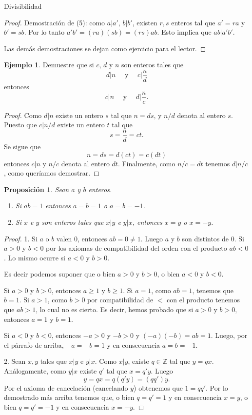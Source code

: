\documentclass[11pt,spanish,makeidx]{amsbook}
\newtheorem{proposicion}[teorema]{Proposici\'on}
\theoremstyle{definition}
\newtheorem{ejemplo}{Ejemplo}[section]
\theoremstyle{remark}
\begin{document}
\begin{section}{Divisibilidad}
\begin{proof}
	Demostración de (5): como $a|a'$, $b|b'$, existen $r,s$ enteros tal que $a'=ra$ y $b' =sb$. Por lo tanto $a'b' = (ra)(sb) = (rs)ab$. Esto implica que  $ab|a'b'$.

	Las demás demostraciones se dejan como ejercicio para el lector. 

\end{proof}

\begin{ejemplo} Demuestre que si $c$, $d$ y $n$ son enteros tales
que
$$
d|n \quad\text{ y }\quad c|\frac{n}{d}
$$
entonces
$$
c|n \quad\text{ y }\quad d|\frac{n}{c}.
$$
\end{ejemplo}
\begin{proof} Como $d|n$ existe un entero $s$ tal que $n=ds$, y $n/d$ denota al entero $s$. Puesto que $c|n/d$ existe un entero $t$ tal que
$$
s=\frac{n}{d} =ct.
$$
Se sigue que
$$
n=ds=d(ct)=c(dt)
$$
entonces $c|n$ y $n/c$ denota al entero $dt$. Finalmente, como $n/c=dt$ tenemos $d|n/c$, como queríamos demostrar.
\end{proof}

\begin{proposicion}\label{pm} Sean $a$ y $b$ enteros.
\begin{enumerate}
\item Si  $ab=1$ entonces $a=b=1$ o $a=b=-1$. 
\item Si $x$ e $y$ son enteros tales que $x|y$ e $y|x$, entonces $x=y$ o $x=-y$.
\end{enumerate}
\end{proposicion}
\begin{proof} 1. Si $a$ o $b$ valen 0, entonces $ab=0 \not=1$. Luego $a$ y $b$ son distintos de 0. Si $a>0$ y $b<0$ por los axiomas de compatibilidad del orden con el producto $ab<0$. Lo mismo ocurre si $a<0$ y $b>0$.

Es decir podemos suponer que o bien $a>0$ y $b>0$, o bien $a<0$ y $b<0$. 

Si  $a>0$ y $b>0$, entonces  $a\ge 1$ y $b\ge 1$. Si $a=1$, como $ab =1$, tenemos que $b = 1$. Si $a>1$, como  $b>0$ por compatibilidad de $<$ con el producto tenemos que $ab>1$, lo cual no es cierto. Es decir, hemos probado que si  $a>0$ y $b>0$, entonces $a=1$ y $b=1$.

Si  $a<0$ y $b<0$, entonces   $-a>0$ y $-b>0$ y $(-a)(-b) = ab =1$. Luego, por el párrafo de arriba, $-a=-b=1$ y en consecuencia $a=b=-1$.

\vskip 0.1cm

2. Sean $x,y$ tales que  $x|y$ e $y|x$. Como $x|y$, existe $q \in \mathbb Z$ tal que $y = qx$. Análogamente, como $y|x$ existe $q'$ tal que $x = q'y$. Luego
$$
y = qx = q(q'y) = (qq')y.
$$
Por el axioma de cancelación (cancelando $y$) obtenemos que $1 = qq'$. Por lo demostrado más arriba tenemos que, o bien $q=q'=1$ y en consecuencia $x=y$, o bien $q=q'=-1$ y en consecuencia $x=-y$. 
\end{proof}


\end{section}
\end{document}
